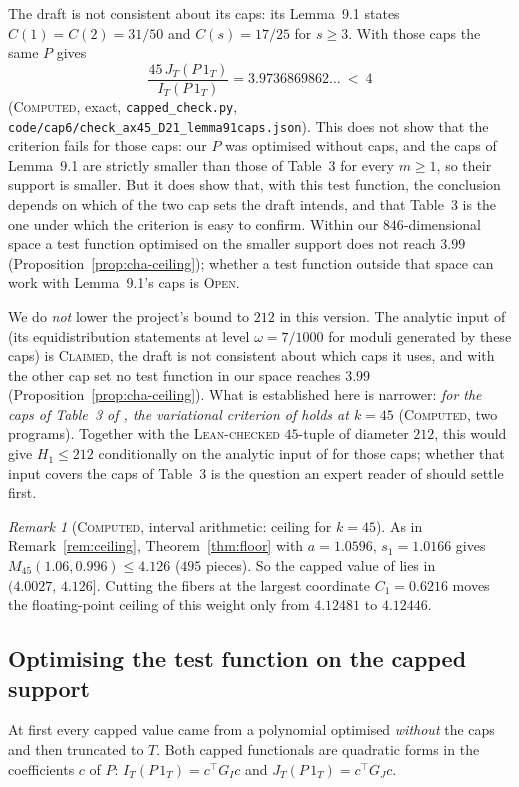 \documentclass[11pt]{amsart}
\theoremstyle{definition}
\theoremstyle{remark}
\newtheorem{remark}[theorem]{Remark}
\newcommand{\lbl}[1]{\textup{\textsc{#1}}}
\begin{document}
The draft \cite{Cha26} is not consistent about
its caps: its Lemma~9.1 states $C(1)=C(2)=31/50$ and $C(s)=17/25$ for
$s\ge3$. With those caps the same $P$ gives
\[
\frac{45\,J_T(P\,1_T)}{I_T(P\,1_T)}=3.9736869862\ldots\ <\ 4
\]
(\lbl{Computed}, exact, \texttt{capped\_check.py},
\texttt{code/cap6/check\_ax45\_D21\_lemma91caps.json}).
This does not show that the criterion fails for those caps: our $P$
was optimised without caps, and the caps of Lemma~9.1 are strictly smaller
than those of Table~3 for every $m\ge1$, so their support is smaller. But it does show
that, with this test function, the conclusion depends on which of the two
cap sets the draft intends, and that Table~3 is the one under which the
criterion is easy to confirm. Within our $846$-dimensional space a test
function optimised on the smaller support does not reach $3.99$
(Proposition~\ref{prop:cha-ceiling}); whether a test function
outside that space can work with Lemma~9.1's caps is \lbl{Open}.

We do \emph{not} lower the project's bound to $212$ in this version. The
analytic input of \cite{Cha26} (its equidistribution statements at level
$\omega=7/1000$ for moduli generated by these caps) is \lbl{Claimed}, the
draft is not consistent about which caps it uses, and with the other cap set
no test function in our space reaches $3.99$
(Proposition~\ref{prop:cha-ceiling}). What is established here is narrower:
\emph{for the caps of Table~3 of \cite{Cha26}, the variational criterion of
\cite[Thm.~4.10]{Cha26} holds at $k=45$} (\lbl{Computed}, two programs).
Together with the \lbl{Lean-checked} $45$-tuple of diameter $212$, this
would give $H_1\le212$ conditionally on the analytic input of \cite{Cha26}
for those caps; whether that input covers the caps of Table~3 is the question
an expert reader of \cite{Cha26} should settle first.

\begin{remark}[\lbl{Computed}, interval arithmetic: ceiling for $k=45$]\label{rem:ceiling45}
As in Remark~\ref{rem:ceiling}, Theorem~\ref{thm:floor} with $a=1.0596$,
$s_1=1.0166$ gives $M_{45}(1.06,0.996)\le4.126$ ($495$ pieces). So the
capped value of \cite{Cha26} lies in $(4.0027,\,4.126]$. Cutting the fibers at
the largest coordinate $C_1=0.6216$ moves the floating-point ceiling of this
weight only from $4.12481$ to $4.12446$.
\end{remark}

\subsection*{Optimising the test function on the capped support}
At first every capped value came from a polynomial optimised
\emph{without} the caps and then truncated to $T$. Both capped functionals
are quadratic forms in the coefficients $c$ of $P$:
$I_T(P\,1_T)=c^{\top}G_Ic$ and $J_T(P\,1_T)=c^{\top}G_Jc$.
\end{document}
